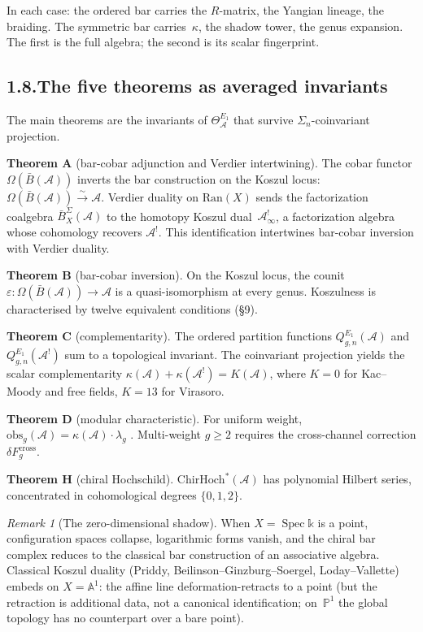 \documentclass[11pt,reqno]{amsart}
\theoremstyle{definition}
\theoremstyle{remark}
\newtheorem{remark}[theorem]{Remark}
\providecommand{\cA}{\mathcal{A}}
\providecommand{\barB}{\bar{B}}
\providecommand{\bP}{\mathbb{P}}
\providecommand{\bA}{\mathbb{A}}
\providecommand{\Bbbk}{\mathbb{k}}
\numberwithin{equation}{section}
\begin{document}
In each case: the ordered bar carries the $R$-matrix, the Yangian
lineage, the braiding. The symmetric bar carries~$\kappa$, the
shadow tower, the genus expansion. The first is the full algebra;
the second is its scalar fingerprint.

\subsection*{1.8.\enspace The five theorems as averaged invariants}

The main theorems are the invariants of
$\Theta^{E_1}_{\cA}$ that survive $\Sigma_n$-coinvariant projection.

\medskip
\noindent\textbf{Theorem A} (bar-cobar adjunction and Verdier
intertwining). The cobar functor $\Omega(\barB(\cA))$ inverts
the bar construction on the Koszul locus:
$\Omega(\barB(\cA))\xrightarrow{\sim}\cA$. Verdier duality on
$\mathrm{Ran}(X)$ sends the factorization coalgebra
$\barB_X^\Sigma(\cA)$ to the homotopy Koszul
dual~$\cA^!_\infty$, a factorization algebra whose cohomology
recovers $\cA^!$. This identification intertwines bar-cobar
inversion with Verdier duality.

\medskip
\noindent\textbf{Theorem B} (bar-cobar inversion). On the Koszul
locus, the counit $\varepsilon\colon\Omega(\barB(\cA))\to\cA$ is a
quasi-isomorphism at every genus. Koszulness is characterised by
twelve equivalent conditions (\S9).

\medskip
\noindent\textbf{Theorem C} (complementarity). The ordered
partition functions $Q^{E_1}_{g,n}(\cA)$ and $Q^{E_1}_{g,n}(\cA^!)$
sum to a topological invariant. The coinvariant projection
yields the scalar complementarity $\kappa(\cA)+\kappa(\cA^!)=K(\cA)$,
where $K=0$ for Kac--Moody and free fields, $K=13$ for Virasoro.

\medskip
\noindent\textbf{Theorem D} (modular characteristic). For uniform
weight, $\mathrm{obs}_g(\cA)=\kappa(\cA)\cdot\lambda_g$ . Multi-weight $g\ge 2$ requires the cross-channel
correction $\delta F_g^{\mathrm{cross}}$.

\medskip
\noindent\textbf{Theorem H} (chiral Hochschild).
$\mathrm{ChirHoch}^*(\cA)$ has polynomial Hilbert series,
concentrated in cohomological degrees $\{0,1,2\}$.

\begin{remark}[The zero-dimensional shadow]\label{rem:preface-zero-dim}
When $X=\operatorname{Spec}\Bbbk$ is a point, configuration spaces
collapse, logarithmic forms vanish, and the chiral bar complex reduces
to the classical bar construction of an associative algebra.
Classical Koszul duality (Priddy, Beilinson--Ginzburg--Soergel,
Loday--Vallette) embeds on $X=\bA^1$: the affine line
deformation-retracts to a point (but the retraction is additional
data, not a canonical identification; on~$\bP^1$ the global topology
has no counterpart over a bare point).
\end{remark}
\end{document}

